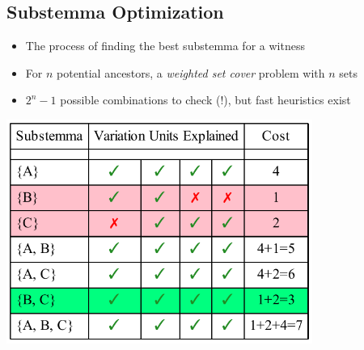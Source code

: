 \documentclass[10pt]{beamer}
\begin{document}
	\subsection{Substemma Optimization}
	\begin{frame}
		\begin{itemize}
			\item The process of finding the best substemma for a witness
			\item For $n$ potential ancestors, a \emph{weighted set cover} problem with $n$ sets 
			\item $2^n - 1$ possible combinations to check (!), but fast heuristics exist
		\end{itemize}
		\begin{center}
			\includegraphics[width=0.75\textwidth]{../img/weighted-set-cover.pdf}
		\end{center}
	\end{frame}
\end{document}
